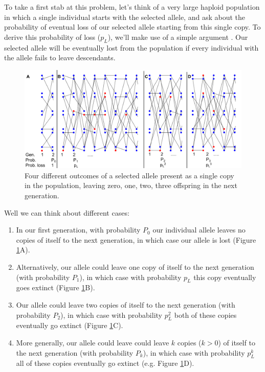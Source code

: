 To take a first stab at this problem, let's think of a very large
haploid population in which a single individual starts with the selected allele, and ask
about the probability of eventual loss of our selected allele starting
from this single copy. To derive this probability of loss ($p_L$), we'll make use of a
simple argument \citep[derived from branching processes][]{fisher1923xxi,haldane1927mathematical}. Our selected
allele will be eventually lost from the population if every individual
with the allele fails to leave descendants.
\begin{figure}
\begin{center}
\includegraphics[width=0.9 \textwidth]{figures/Proof_of_pL_2s.pdf}
\end{center}
\caption{Four different outcomes of a selected allele present as a
  single copy in the population, leaving zero, one, two, three
  offspring in the next generation.} \label{fig:Proof_of_pL_2s}
\end{figure}
Well we can think about different cases: 
\begin{enumerate}
\item In our first generation,
with probability $P_0$ our individual allele leaves no copies of itself to
the next generation, in which case our allele is lost (Figure \ref{fig:Proof_of_pL_2s}A).
\item Alternatively,
our allele could leave one copy of itself to the next generation (with
probability $P_1$), in which
case with probability $p_L$ this copy eventually goes extinct (Figure \ref{fig:Proof_of_pL_2s}B).
\item Our allele could leave two copies of itself to the next generation (with
probability $P_2$), in which
case with probability $p_L^2$ both of these copies eventually go
extinct (Figure \ref{fig:Proof_of_pL_2s}C).
\item More generally, our allele could leave could leave $k$ copies ($k>0$) of itself to the next generation (with
probability $P_k$), in which case with probability $p_L^k$  all of
these copies eventually go extinct (e.g. Figure \ref{fig:Proof_of_pL_2s}D).
\end{enumerate}
